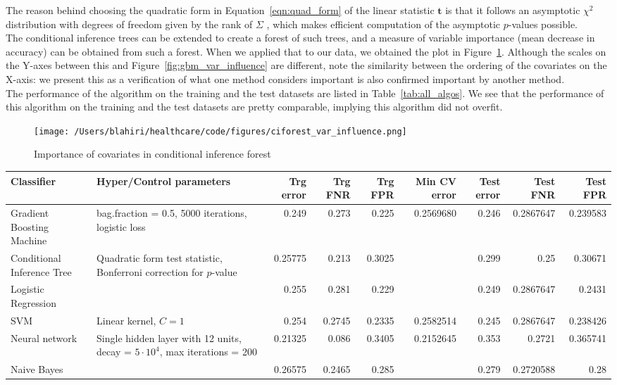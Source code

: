 The reason behind choosing the quadratic form in Equation~\ref{eqn:quad_form} of the linear statistic $\mathbf{t}$ is that it follows an asymptotic ${\chi}^2$ distribution with degrees of freedom given by the rank of $\Sigma$ \cite{Rasch1995}, which makes efficient computation of the asymptotic $p$-values possible.\\

The conditional inference trees can be extended to create a forest of such trees, and a measure of variable importance (mean decrease in accuracy) can be obtained from such a forest. When we applied that to our data, we obtained the plot in Figure~\ref{fig:ciforest_var_influence}. Although the scales on the Y-axes between this and Figure~\ref{fig:gbm_var_influence} are different,  note the similarity between the ordering of the covariates on the X-axis: we present this as a verification of what one method considers important is also confirmed important by another method.\\

The performance of the algorithm on the training and the test datasets are listed in Table~\ref{tab:all_algos}. We see that the performance of this algorithm on the training and the test datasets are pretty comparable, implying this algorithm did not overfit. 

\begin{figure}[!h]
    \centering
    \texttt{[image: /Users/blahiri/healthcare/code/figures/ciforest\_var\_influence.png]}
    \caption{\small Importance of covariates in conditional inference forest}
    \label{fig:ciforest_var_influence}
\end{figure}

\begin{table*}[!h]
\centering
\caption{Summary of performance of all classifiers}
\begin{tabular}{p{2cm}p{3cm}rrrrrrr}
\hline
Classifier & Hyper/Control parameters & Trg error & Trg FNR & Trg FPR & Min CV error & Test error & Test FNR & Test FPR\\
\hline
Gradient Boosting Machine & bag.fraction = 0.5, 5000 iterations, logistic loss & 0.249 & 0.273 & 0.225 & 0.2569680 & 0.246 & 0.2867647 & 0.239583\\
Conditional Inference Tree & Quadratic form test statistic, Bonferroni correction for $p$-value & 0.25775 & 0.213 & 0.3025 & & 0.299 & 0.25 & 0.30671\\
Logistic Regression & & 0.255 & 0.281 & 0.229 & & 0.249 & 0.2867647 & 0.2431\\
SVM & Linear kernel, $C = 1$ & 0.254 & 0.2745 & 0.2335 & 0.2582514 & 0.245 & 0.2867647 & 0.238426\\
Neural network & Single hidden layer with 12 units, decay = $5{\cdot}10^4$, max iterations = 200 & 0.21325 & 0.086 & 0.3405 & 0.2152645 & 0.353 & 0.2721 & 0.365741\\
Naive Bayes & & 0.26575 & 0.2465 & 0.285 & & 0.279 & 0.2720588 & 0.28\\
\hline
\end{tabular}
\label{tab:all_algos}
\end{table*}


